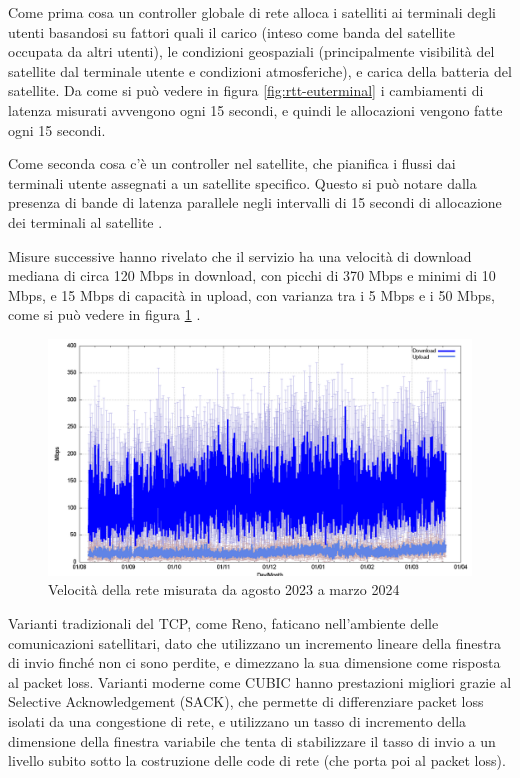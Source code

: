Come prima cosa un controller globale di rete alloca i satelliti ai terminali degli utenti basandosi su fattori quali il carico (inteso come banda del satellite occupata da altri utenti), le condizioni geospaziali (principalmente visibilità del satellite dal terminale utente e condizioni atmosferiche), e carica della batteria del satellite.
Da come si può vedere in figura \ref{fig:rtt-euterminal} i cambiamenti di latenza misurati avvengono ogni 15 secondi, e quindi le allocazioni vengono fatte ogni 15 secondi.

Come seconda cosa c'è un controller nel satellite, che pianifica i flussi dai terminali utente assegnati a un satellite specifico.
Questo si può notare dalla presenza di bande di latenza parallele negli intervalli di 15 secondi di allocazione dei terminali al satellite \cite{tanveer_making_2023} \cite{geoff_huston_transport_2024}.

Misure successive hanno rivelato che il servizio ha una velocità di download mediana di circa 120 Mbps in download, con picchi di 370 Mbps e minimi di 10 Mbps, e 15 Mbps di capacità in upload, con varianza tra i 5 Mbps e i 50 Mbps, come si può vedere in figura \ref{fig:starlink-performance} \cite{geoff_huston_transport_2024}.

\begin{figure}[htbp]
  \centering
  \includegraphics[width=0.8\linewidth]{./res/img/starlink_performance.png}
  \caption{Velocità della rete misurata da agosto 2023 a marzo 2024}
  \label{fig:starlink-performance}
\end{figure}

Varianti tradizionali del \ac{TCP}, come Reno, faticano nell'ambiente delle comunicazioni satellitari, dato che utilizzano un incremento lineare della finestra di invio finché non ci sono perdite, e dimezzano la sua dimensione come risposta al packet loss.
Varianti moderne come CUBIC hanno prestazioni migliori grazie al Selective Acknowledgement (SACK), che permette di differenziare packet loss isolati da una congestione di rete, e utilizzano un tasso di incremento della dimensione della finestra variabile che tenta di stabilizzare il tasso di invio a un livello subito sotto la costruzione delle code di rete (che porta poi al packet loss).

